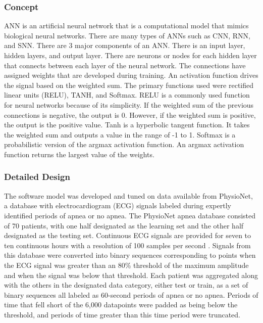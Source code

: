 \documentclass[12pt,titlepage]{article}
\begin{document}
\subsubsection{Concept}
ANN is an artificial neural network that is a computational model that mimics biological neural networks. There are many types of ANNs such as CNN, RNN, and SNN. There are 3 major components of an ANN. There is an input layer, hidden layers, and output layer. There are neurons or nodes for each hidden layer that connects between each layer of the neural network. The connections have assigned weights that are developed during training. An activation function drives the signal based on the weighted sum. The primary functions used were rectified linear units (RELU), TANH, and Softmax. RELU is a commonly used function for neural networks because of its simplicity. If the weighted sum of the previous connections is negative, the output is 0. However, if the weighted sum is positive, the output is the positive value. Tanh is a hyperbolic tangent function. It takes the weighted sum and outputs a value in the range of -1 to 1. Softmax is a probabilistic version of the argmax activation function. An argmax activation function returns the largest value of the weights.

\subsubsection{Detailed Design}
The software model was developed and tuned on data available from PhysioNet, a database with electrocardiogram (ECG) signals labeled during expertly 
identified periods of apnea or no apnea. The PhysioNet apnea database consisted of 70 patients, with one half designated as the learning
set and the other half designated as the testing set. Continuous ECG signals are provided for seven to ten continuous hours with a resolution of 100 samples 
per second \cite{physiobank}. Signals from this database were converted into binary sequences corresponding to points when the ECG signal was greater than
an 80\% threshold of the maximum amplitude and when the signal was below that threshold. Each patient was aggregated along with the others in the designated
data category, either test or train, as a set of binary sequences all labeled as 60-second periods of apnea or no apnea. Periods of time that fell short of the
6,000 datapoints were padded as being below the threshold, and periods of time greater than this time period were truncated.
\end{document}
